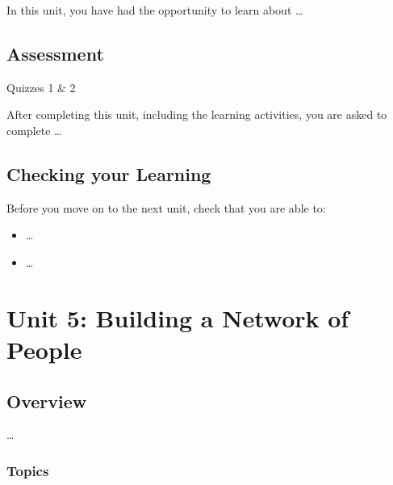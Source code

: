 \documentclass[
]{book}
\providecommand{\tightlist}{%
  \setlength{\itemsep}{0pt}\setlength{\parskip}{0pt}}
\theoremstyle{definition}
\theoremstyle{definition}
\theoremstyle{definition}
\theoremstyle{definition}
\theoremstyle{remark}
\begin{document}
In this unit, you have had the opportunity to learn about \ldots{}

\hypertarget{assessment-3}{%
\section*{Assessment}\label{assessment-3}}

\begin{assessment}
{Quizzes 1 \& 2}

After completing this unit, including the learning activities, you are asked to complete \ldots{}
\end{assessment}

\hypertarget{checking-your-learning-3}{%
\section*{Checking your Learning}\label{checking-your-learning-3}}

\begin{progress}
Before you move on to the next unit, check that you are able to:

\begin{itemize}
\tightlist
\item
  \ldots{}
\item
  \ldots{}
\end{itemize}
\end{progress}

\hypertarget{unit-5-building-a-network-of-people}{%
\chapter{Unit 5: Building a Network of People}\label{unit-5-building-a-network-of-people}}

\hypertarget{overview-4}{%
\section*{Overview}\label{overview-4}}

\ldots{}

\hypertarget{topics-4}{%
\subsection*{Topics}\label{topics-4}}
\end{document}
